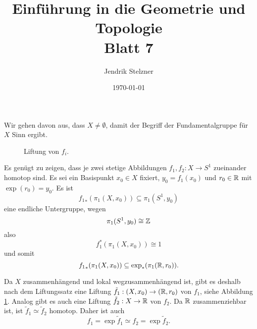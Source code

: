 \documentclass[a4paper,10pt]{article}
\title{\sc Einführung in die Geometrie und Topologie \\ \Large Blatt 7}
\author{Jendrik Stelzner}
\date{\today}
\begin{document}
\maketitle





\section{}
Wir gehen davon aus, dass $X \neq \emptyset$, damit der Begriff der Fundamentalgruppe für $X$ Sinn ergibt.

\begin{figure}[ht]\centering
 \caption{Liftung von $f_i$.}
 \label{fig: Liftung von f_i}
\end{figure}

Es genügt zu zeigen, dass je zwei stetige Abbildungen $f_1, f_2 : X \to S^1$ zueinander homotop sind. Es sei ein Basispunkt $x_0 \in X$ fixiert, $y_0 = f_1(x_0)$ und $r_0 \in \mathbb{R}$ mit $\exp(r_0) = y_0$. Es ist
\[
 {f_1}_* (\pi_1(X,x_0)) \subseteq \pi_1(S^1, y_0)
\]
eine endliche Untergruppe, wegen
\[
 \pi_1(S^1, y_0) \cong \mathbb{Z}
\]
also
\[
 f_1^*(\pi_1(X,x_0)) \cong 1
\]
und somit
\[
 {f_1}_*(\pi_1(X,x_0)) \subseteq \exp_*(\pi_1(\mathbb{R},r_0)).
\]

Da $X$ zusammenhängend und lokal wegzusammenhängend ist, gibt es deshalb nach dem Liftungssatz eine Liftung $\tilde{f}_1 : (X,x_0) \to (\mathbb{R}, r_0)$ von $f_1$, siehe Abbildung \ref{fig: Liftung von f_i}. Analog gibt es auch eine Liftung $\tilde{f}_2 : X \to \mathbb{R}$ von $f_2$. Da $\mathbb{R}$ zusammenziehbar ist, ist $\tilde{f}_1 \simeq \tilde{f}_2$ homotop. Daher ist auch
\[
 f_1 = \exp \tilde{f}_1 \simeq f_2 = \exp \tilde{f}_2.
\]
\end{document}
